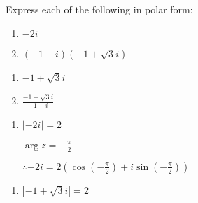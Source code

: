 \documentclass[11pt,a4paper]{book}
\begin{document}
\begin{example}

Express each of the following in polar form:

\begin{minipage}[t]{0.5\textwidth}

\begin{enumerate}[label=(\alph*)]

\item  $-2i$

\addtocounter{enumi}{1}

\item  $\left(-1-i\right)\left(-1+\sqrt{3}i\right)$

\end{enumerate}

\end{minipage}
\begin{minipage}[t]{0.5\textwidth}

\begin{enumerate}[label=(\alph*),start=2]

\item  $-1+\sqrt{3}i$

\addtocounter{enumi}{1}

\item  ${\displaystyle \frac{-1+\sqrt{3}i}{-1-i}}$

\addtocounter{enumi}{1}

\end{enumerate}

\end{minipage}

\Solution

\begin{minipage}[t]{0.5\textwidth}

\begin{enumerate}[label=(\alph*)]

\item  $\left|-2i\right|=2$

${\displaystyle \arg z=-\frac{\pi}{2}}$

${\displaystyle \therefore-2i=2\left(\cos\left(-\frac{\pi}{2}\right)+i\sin\left(-\frac{\pi}{2}\right)\right)}$
\end{enumerate}
\end{minipage}
\begin{minipage}[t]{0.5\textwidth}
\begin{enumerate}[label=(\alph*),start=2]

\item  $\left|-1+\sqrt{3}i\right|=2$


\end{enumerate}
\end{minipage}
\end{example}
\end{document}
